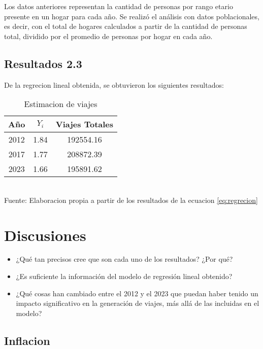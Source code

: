 \documentclass[12pt]{article} %
\begin{document}
Los datos anteriores representan la cantidad de personas por rango etario presente en un hogar para cada año. 
Se realizó el análisis con datos poblacionales, es decir, con el total de hogares calculados a partir de la cantidad de 
personas total, dividido por el promedio de personas por hogar en cada año. 

\subsection{Resultados 2.3}

De la regrecion lineal obtenida, se obtuvieron los siguientes resultados:

\begin{table}[H]
    \centering
    \caption{Estimacion de viajes}
    \vspace{0.2cm}
    \begin{tabular}{|c|c|c|}
        \hline
        Año & $Y_i$ & Viajes Totales \\
        \hline
        2012 & 1.84 & 192554.16\\
        2017 & 1.77 & 208872.39\\
        2023 & 1.66 & 195891.62\\
        \hline
    \end{tabular}
    \vspace{0.2cm}
    \\ Fuente: Elaboracion propia a partir de los resultados de la ecuacion \ref{eq:regrecion}
\end{table}

\section{Discusiones}

\begin{itemize}
    \item ¿Qué tan precisos cree que son cada uno de los resultados? ¿Por qué?
    \item ¿Es suficiente la información del modelo de regresión lineal obtenido?
    \item ¿Qué cosas han cambiado entre el 2012 y el 2023 que puedan haber tenido un impacto significativo en la generación de viajes, más allá de las incluidas en el modelo?
\end{itemize}

\subsection{Inflacion}
\end{document}
